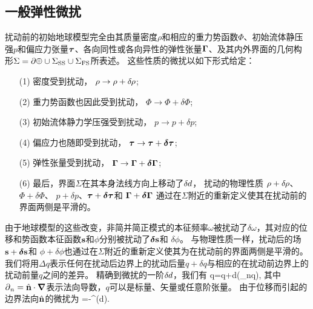 \subsection{一般弹性微扰}
%

扰动前的初始地球模型完全由其质量密度$\rho$和相应的重力势函数$\Phi$、初始流体静压强$p$和偏应力张量$\mbox{\boldmath $\bf \tau$}$、各向同性或各向异性的弹性张量$\mbox{\boldmath $\bf \Gamma$}$、及其内外界面的几何构形$\Sigma=\p\earth\cup\Sigma_{\rm SS}\cup\Sigma_{\rm FS}$所表述。
这些性质的微扰以如下形式给定：
\begin{enumerate}
\item[(1)]
%
密度受到扰动， $\rho\rightarrow\rho+\delta\hspace{-0.2 mm}\rho$;
\item[(2)]
%
重力势函数也因此受到扰动，
$\Phi\rightarrow\Phi+\delta\Phi$;
\item[(3)] 
%
初始流体静力学压强受到扰动，
$p\rightarrow p+\delta p$;
\item[(4)]
%
偏应力也随即受到扰动，
$\mbox{\boldmath $\bf \tau$}\rightarrow\mbox{\boldmath $\bf \tau$}+\mbox{\boldmath $\bf \delta$}\mbox{\boldmath $\bf \tau$}$;
\item[(5)]
%
弹性张量受到扰动，
$\mbox{\boldmath $\bf \Gamma$}\rightarrow\mbox{\boldmath $\bf \Gamma$}+\mbox{\boldmath $\bf \delta$}\mbox{\boldmath $\bf \Gamma$}$;
\item[(6)]
%
最后，界面$\Sigma$在其本身法线方向上移动了$\delta\hspace{-0.1 mm}d$，
扰动的物理性质
$\rho+\delta\hspace{-0.2 mm}\rho$、$\Phi+\delta\Phi$、
$p+\delta p$、$\mbox{\boldmath $\bf \tau$}+\mbox{\boldmath $\bf \delta$}\mbox{\boldmath $\bf \tau$}$和
$\mbox{\boldmath $\bf \Gamma$}+\mbox{\boldmath $\bf \delta$}\mbox{\boldmath $\bf \Gamma$}$
通过在$\Sigma$附近的重新定义使其在扰动前的界面两侧是平滑的。
\end{enumerate}
由于地球模型的这些改变，非简并简正模式的本征频率$\omega$被扰动了$\delta\omega$，其对应的位移和势函数本征函数$\mbox{${\bf s}$}$和$\phi$分别被扰动了$\mbox{\boldmath $\bf \delta$}\mbox{${\bf s}$}$和 $\delta\phi$。
与物理性质一样，扰动后的场$\mbox{${\bf s}$}+\mbox{\boldmath $\bf \delta$}\mbox{${\bf s}$}$和
$\phi+\delta\phi$也通过在$\Sigma$附近的重新定义使其为在扰动前的界面两侧是平滑的。
我们将用$\Delta q$表示任何在扰动后边界上的扰动后量$q+\delta q$与相应的在扰动前边界上的扰动前量$q$之间的差异。
精确到微扰的一阶$\delta\hspace{-0.1 mm}d$，我们有
\eq
\label{13.deltaq1}
\Delta q=\delta q+\delta\hspace{-0.1 mm}d(\p_nq),
\en 
其中$\mbox{$\partial$}_n=\mbox{$\hat{\mbox{${\bf n}$}}$}\cdot\mbox{\boldmath $\nabla$}$表示法向导数，$q$可以是标量、矢量或任意阶张量。
由于位移而引起的边界法向$\mbox{$\hat{\mbox{${\bf n}$}}$}$的微扰为
\eq
\label{13.deltanhat}
\Delta\bnh=-\bdel^{\Sigma}(\delta\hspace{-0.1 mm}d).
